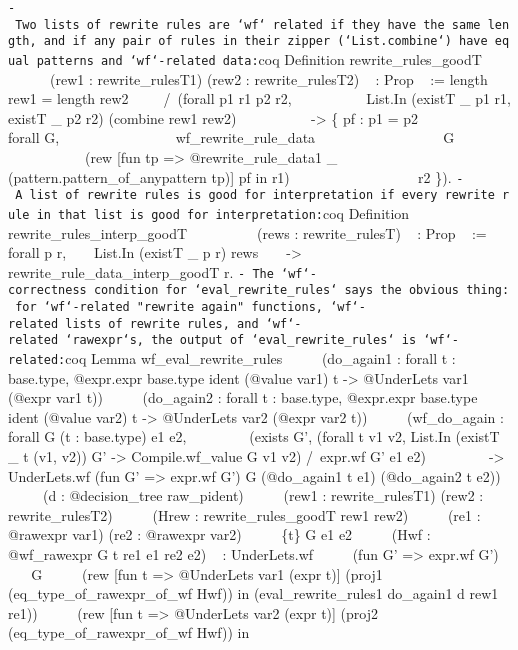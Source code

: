 \begin{itemize}
  \texttt{-\ Two\ lists\ of\ rewrite\ rules\ are\ `wf`\ related\ if\ they\ have\ the\ same\ length,\ and\ if\ any\ pair\ of\ rules\ in\ their\ zipper\ (`List.combine`)\ have\ equal\ patterns\ and\ `wf`-related\ data:}coq
  Definition rewrite\_rules\_goodT ~ ~ ~ ~ ~ ~(rew1 : rewrite\_rulesT1)
  (rew2 : rewrite\_rulesT2) ~ : Prop ~ := length rew1 = length rew2 ~ ~
  ~/~(forall p1 r1 p2 r2, ~ ~ ~ ~ ~ ~ List.In (existT \_ p1 r1, existT
  \_ p2 r2) (combine rew1 rew2) ~ ~ ~ ~ ~ ~ -\textgreater{} \{ pf : p1 =
  p2 ~ ~ ~ ~ ~ ~ ~ ~\textbar{} forall G, ~ ~ ~ ~ ~ ~ ~ ~ ~
  ~wf\_rewrite\_rule\_data ~ ~ ~ ~ ~ ~ ~ ~ ~ ~ ~G ~ ~ ~ ~ ~ ~ ~ ~ ~ ~
  ~(rew {[}fun tp =\textgreater{} @rewrite\_rule\_data1 \_
  (pattern.pattern\_of\_anypattern tp){]} pf in r1) ~ ~ ~ ~ ~ ~ ~ ~ ~ ~
  ~r2 \}).
  \texttt{-\ A\ list\ of\ rewrite\ rules\ is\ good\ for\ interpretation\ if\ every\ rewrite\ rule\ in\ that\ list\ is\ good\ for\ interpretation:}coq
  Definition rewrite\_rules\_interp\_goodT ~ ~ ~ ~ ~ ~(rews :
  rewrite\_rulesT) ~ : Prop ~ := forall p r, ~ ~ List.In (existT \_ p r)
  rews ~ ~ -\textgreater{} rewrite\_rule\_data\_interp\_goodT r.
  \texttt{-\ The\ `wf`-correctness\ condition\ for\ `eval\_rewrite\_rules`\ says\ the\ obvious\ thing:\ for\ `wf`-related\ "rewrite\ again"\ functions,\ `wf`-related\ lists\ of\ rewrite\ rules,\ and\ `wf`-related\ `rawexpr`s,\ the\ output\ of\ `eval\_rewrite\_rules`\ is\ `wf`-related:}coq
  Lemma wf\_eval\_rewrite\_rules ~ ~ ~ (do\_again1 : forall t :
  base.type, @expr.expr base.type ident (@value var1) t -\textgreater{}
  @UnderLets var1 (@expr var1 t)) ~ ~ ~ (do\_again2 : forall t :
  base.type, @expr.expr base.type ident (@value var2) t -\textgreater{}
  @UnderLets var2 (@expr var2 t)) ~ ~ ~ (wf\_do\_again : forall G (t :
  base.type) e1 e2, ~ ~ ~ ~ ~ (exists G', (forall t v1 v2, List.In
  (existT \_ t (v1, v2)) G' -\textgreater{} Compile.wf\_value G v1 v2)
  /~expr.wf G' e1 e2) ~ ~ ~ ~ ~ -\textgreater{} UnderLets.wf (fun G'
  =\textgreater{} expr.wf G') G (@do\_again1 t e1) (@do\_again2 t e2)) ~
  ~ ~ (d : @decision\_tree raw\_pident) ~ ~ ~ (rew1 : rewrite\_rulesT1)
  (rew2 : rewrite\_rulesT2) ~ ~ ~ (Hrew : rewrite\_rules\_goodT rew1
  rew2) ~ ~ ~ (re1 : @rawexpr var1) (re2 : @rawexpr var2) ~ ~ ~ \{t\} G
  e1 e2 ~ ~ ~ (Hwf : @wf\_rawexpr G t re1 e1 re2 e2) ~ : UnderLets.wf ~
  ~ ~ (fun G' =\textgreater{} expr.wf G') ~ ~ ~ G ~ ~ ~ (rew {[}fun t
  =\textgreater{} @UnderLets var1 (expr t){]} (proj1
  (eq\_type\_of\_rawexpr\_of\_wf Hwf)) in (eval\_rewrite\_rules1
  do\_again1 d rew1 re1)) ~ ~ ~ (rew {[}fun t =\textgreater{} @UnderLets
  var2 (expr t){]} (proj2 (eq\_type\_of\_rawexpr\_of\_wf Hwf)) in

\end{itemize}
